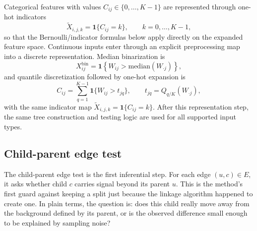 Categorical features with values $C_{ij} \in \{0,\dots,K-1\}$ are represented
through one-hot indicators
\begin{equation}
\tilde{X}_{i,j,k} = \mathbf{1}\{C_{ij} = k\},
\qquad
k = 0,\dots,K-1,
\end{equation}
so that the Bernoulli/indicator formulas below apply directly on the expanded
feature space. Continuous inputs enter through an explicit preprocessing map
into a discrete representation. Median binarization is
\begin{equation}
X_{ij}^{\mathrm{bin}}
=
\mathbf{1}\!\left\{
W_{ij} > \mathrm{median}(W_{\cdot j})
\right\},
\end{equation}
and quantile discretization followed by one-hot expansion is
\begin{equation}
C_{ij}
=
\sum_{q=1}^{K-1} \mathbf{1}\{W_{ij} > t_{jq}\},
\qquad
t_{jq} = Q_{q/K}(W_{\cdot j}),
\end{equation}
with the same indicator map
$\tilde{X}_{i,j,k} = \mathbf{1}\{C_{ij} = k\}$. After this representation step,
the same tree construction and testing logic are used for all supported input
types.

\subsection{Child-parent edge test}

The child-parent edge test is the first inferential step. For each edge
$(u,c) \in E$, it asks whether child $c$ carries signal beyond its parent $u$.
This is the method's first guard against keeping a split just because the
linkage algorithm happened to create one. In plain terms, the question is:
does this child really move away from the background defined by its parent, or
is the observed difference small enough to be explained by sampling noise?

